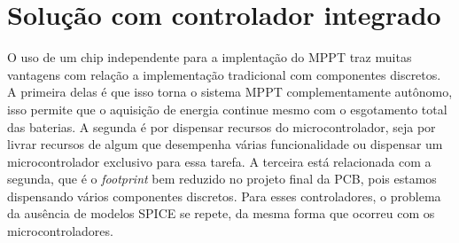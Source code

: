 \section{Solução com controlador integrado}

O uso de um chip independente para a implentação do MPPT traz muitas vantagens com relação a implementação tradicional com componentes discretos. A primeira delas é que isso torna o sistema MPPT complementamente autônomo, isso permite que o aquisição de energia continue mesmo com o esgotamento total das baterias. A segunda é por dispensar recursos do microcontrolador, seja por livrar recursos de algum que desempenha várias funcionalidade ou dispensar um microcontrolador exclusivo para essa tarefa. A terceira está relacionada com a segunda, que é o \textit{footprint} bem reduzido no projeto final da PCB, pois estamos dispensando vários componentes discretos. Para esses controladores, o problema da ausência de modelos SPICE se repete, da mesma forma que ocorreu com os microcontroladores.




